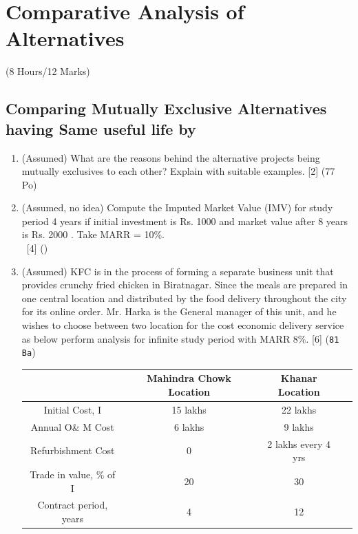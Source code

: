 \documentclass[12pt]{article}
\newcommand{\enter}{\\\textcolor{white}{1}}
\begin{document}
	\pagebreak
\section{Comparative Analysis of Alternatives}
	\begin{center}(8 Hours/12 Marks)\end{center}
	\subsection{Comparing Mutually Exclusive Alternatives having Same useful life by}
	\begin{enumerate}
		\item (Assumed) What are the reasons behind the alternative projects being mutually exclusives to each other? Explain with suitable examples. \hfill [2] (77 Po)
		
		\item (Assumed, no idea) Compute the Imputed Market Value (IMV) for study period 4 years if initial investment is Rs. 1000 and market value after 8 years is Rs. 2000 . Take MARR = 10\%.
		\enter\hfill [4] ()
		
		\item (Assumed) KFC is in the process of forming a separate business unit that provides crunchy fried chicken in Biratnagar. Since the meals are prepared in one central location and distributed by the food delivery throughout the city for its online order. Mr. Harka is the General manager of this unit, and he wishes to choose between two location for the cost economic delivery service as below perform analysis for infinite study period with MARR 8\%. \hfill [6] (\texttt{81 Ba})\\
		\begin{tabular}{|c|c|c|c|}
			\hline
			& Mahindra Chowk Location & Khanar Location \\ \hline
			Initial Cost, I & 15 lakhs & 22 lakhs \\ \hline
			Annual O\& M Cost & 6 lakhs & 9 lakhs \\ \hline
			Refurbishment Cost & 0 & 2 lakhs every 4 yrs \\ \hline
			Trade in value, \% of I & 20 & 30 \\ \hline
			Contract period, years & 4 & 12 \\ \hline
		\end{tabular}
		

\end{enumerate}
\end{document}

